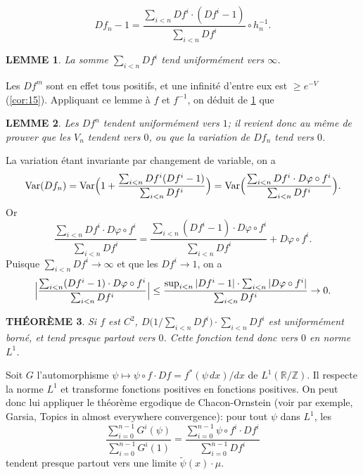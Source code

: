 \documentclass[12pt]{amsart}
\theoremstyle{plain}
\newtheorem{theoreme}{TH\'{E}OR\`{E}ME}[section]
\newtheorem{lemme}[theoreme]{LEMME}
\theoremstyle{remark}
\DeclareMathOperator*{\Var}{Var}
\begin{document}
\begin{equation}\label{eq:331}
Df_{n} - 1 = \frac{\sum_{i < n} Df^{i} \cdot (Df^{i} - 1)}{\sum_{i < n} Df^{i}} \circ h_{n}^{-1} .
\end{equation}

\begin{lemme}\label{lem:34}
La somme $\sum_{i < n} Df^{i}$ tend uniform\'{e}ment vers $\infty$.
\end{lemme}
Les $Df^{m}$ sont en effet tous positifs, et une infinit\'{e} d'entre eux est $\geq e^{-V}$ (\ref{cor:15}). Appliquant ce lemme \`{a} $f$ et $f^{-1}$, on d\'{e}duit de \ref{lem:34} que

\begin{lemme}\label{lem:35}
Les $Df^{n}$ tendent uniform\'{e}ment vers $1$; il revient donc au m\^{e}me de prouver que les $V_{n}$ tendent vers $0$, ou que la variation de $Df_{n}$ tend vers $0$.
\end{lemme}

La variation \'{e}tant invariante par changement de variable, on a
\[
\Var(Df_{n}) = \Var\Bigl(1 + \frac{\sum_{i < n} Df^{i}(Df^{i} - 1)}{\sum_{i < n} Df^{i}}\Bigr) = \Var\Bigl(\frac{\sum_{i < n} Df^{i} \cdot D\varphi \circ f^{i}}{\sum_{i < n} Df^{i}}\Bigr) .
\]
Or
\[
\frac{\sum_{i < n} Df^{i} \cdot D\varphi \circ f^{i}}{\sum_{i < n} Df^{i}} = \frac{\sum_{i < n} (Df^{i} - 1) \cdot D\varphi \circ f^{i}}{\sum_{i < n} Df^{i}} + D\varphi \circ f^{i} .
\]
Puisque $\sum_{i < n} Df^{i} \to \infty$ et que les $Df^{i} \to 1$, on a
\[
\Bigl|\frac{\sum_{i < n} (Df^{i} - 1) \cdot D\varphi \circ f^{i}}{\sum_{i < n} Df^{i}}\Bigr| \leq \frac{\sup_{i < n}|Df^{i} - 1| \cdot \sum_{i < n} |D\varphi \circ f^{i}|}{\sum_{i < n} Df^{i}} \to 0 .
\]

\begin{theoreme}\label{thm:36}
Si $f$ est $C^{2}$, $D\bigl(1/\sum_{i < n} Df^{i}\bigr) \cdot \sum_{i < n} Df^{i}$ est uniform\'{e}ment born\'{e}, et tend presque partout vers $0$. Cette fonction tend donc vers $0$ en norme $L^{1}$.
\end{theoreme}

Soit $G$ l'automorphisme $\psi \mapsto \psi \circ f \cdot Df = f^{*}(\psi\,dx)/dx$ de $L^{1}(\mathbb{R}/\mathbb{Z})$. Il respecte la norme $L^{1}$ et transforme fonctions positives en fonctions positives. On peut donc lui appliquer le th\'{e}or\`{e}me ergodique de Chacon-Ornstein (voir par exemple, Garsia, Topics in almost everywhere convergence): pour tout $\psi$ dans $L^{1}$, les
\[
\frac{\sum_{i=0}^{n-1} G^{i}(\psi)}{\sum_{i=0}^{n-1} G^{i}(1)} = \frac{\sum_{i=0}^{n-1} \psi \circ f^{i} \cdot Df^{i}}{\sum_{i=0}^{n-1} Df^{i}}
\]
tendent presque partout vers une limite $\tilde{\psi}(x) \cdot \mu$.
\end{document}
